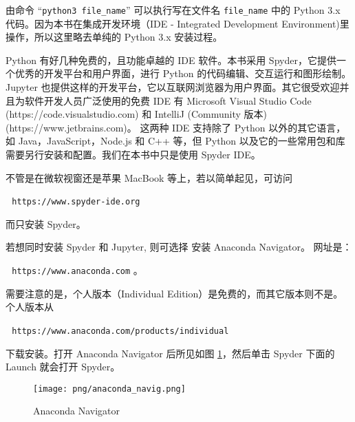 \documentclass[main.tex]{subfiles}
\begin{document}
\noindent 由命令  “\texttt{python3 file\_name}”  可以执行写在文件名
\texttt{file\_name} 中的 Python 3.x 代码。因为本书在集成开发环境（IDE - Integrated Development Environment)里操作，所以这里略去单纯的 Python 3.x 安装过程。

Python 有好几种免费的，且功能卓越的 IDE 软件。本书采用 Spyder，它提供一个优秀的开发平台和用户界面，进行 Python 的代码编辑、交互运行和图形绘制。Jupyter 也提供这样的开发平台，它以互联网浏览器为用户界面。其它很受欢迎并且为软件开发人员广泛使用的免费 IDE 有 Microsoft Visual Studio Code (https://code.visualstudio.com) 和 IntelliJ (Community 版本) (https://www.jetbrains.com)。
这两种 IDE 支持除了 Python 以外的其它语言，如 Java，JavaScript，Node.js 和 C++ 等，但 Python 以及它的一些常用包和库需要另行安装和配置。我们在本书中只是使用 Spyder IDE。  


不管是在微软视窗还是苹果 MacBook 等上，若以简单起见，可访问

\,\,\,\,\texttt{https://www.spyder-ide.org} 

\noindent 而只安装 Spyder。

若想同时安装 Spyder 和 Jupyter, 则可选择 
安装 Anaconda Navigator。 网址是：

\,\,\,\,\texttt{https://www.anaconda.com} 。

\noindent 需要注意的是，个人版本（Individual Edition）是免费的，而其它版本则不是。个人版本从

\,\,\,\,\texttt{https://www.anaconda.com/products/individual} 

\noindent 下载安装。打开 Anaconda Navigator 后所见如图 \ref{fig:2.1.1}，然后单击 Spyder 下面的 Launch 就会打开 Spyder。

\begin{figure}[h]
	\texttt{[image: png/anaconda\_navig.png]}
	\caption{Anaconda Navigator}\label{fig:2.1.1}
\end{figure}
\end{document}
